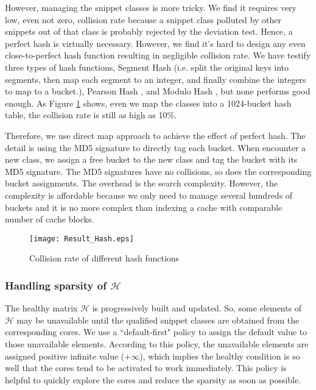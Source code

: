 However, managing the snippet classes is more tricky. We find it requires very low, even not zero, collision rate because a snippet class polluted by other snippets out of that class is probably rejected by the deviation test. Hence, a perfect hash is virtually necessary. However, we find it's hard to design any even close-to-perfect hash function resulting in negligible collision rate. We have testify three types of hash functions, Segment Hash (i.e. split the original keys into segments, then map each segment to an integer, and finally combine the integers to map to a bucket.), Pearson Hash \cite{pearsonhash}, and Modulo Hash \cite{modulo}, but none performs good enough. As Figure \ref{hashresult} shows, even we map the classes into a 1024-bucket hash table, the collision rate is still as high as 10\%.

Therefore, we use direct map approach to achieve the effect of perfect hash. The detail is using the MD5 signature to directly tag each bucket.  When encounter a new class, we assign a free bucket to the new class and tag the bucket with its MD5 signature. The MD5 signatures have no collisions, so does the corresponding bucket assignments.  The overhead is the search complexity. However, the complexity is affordable because we only need to manage several hundreds of buckets and it is no more complex than indexing a cache with comparable number of cache blocks.

\begin{figure}[t]
  \centering
  \texttt{[image: Result\_Hash.eps]}\\
  \caption{Collision rate of different hash functions}\label{hashresult}
\end{figure}


\subsubsection{Handling sparsity of $\mathcal{H}$}
The healthy matrix $\mathcal{H}$ is progressively built and updated.  So, some elements of $\mathcal{H}$ may be unavailable until the  qualified snippet classes are obtained from the corresponding cores. We use a ``default-first" policy to assign the default value to those unavailable elements.  According to this policy,  the unavailable elements are assigned positive infinite value ($+\infty$), which implies the healthy condition is so well that the cores tend to be activated to work immediately.  This policy is helpful to quickly explore the cores and reduce the sparsity as soon as possible.

